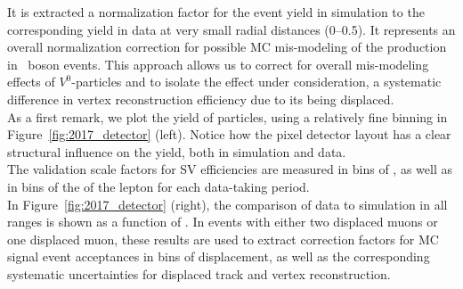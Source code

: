It is extracted a normalization factor for the event yield in
simulation to the corresponding yield in data at very small radial
distances (0--0.5\cm). It represents an overall
normalization correction for possible MC mis-modeling of the
\PKzS production in \PZ~boson events. This approach allows us to correct for
overall mis-modeling effects of $V^0$-particles
and to isolate the effect under consideration, \ie a systematic
difference in vertex reconstruction efficiency due to its being
displaced. \\
As a first remark, we plot the yield of \PKzS particles, using a
relatively fine binning in Figure~\ref{fig:2017_detector} (left). Notice how the pixel detector layout has a clear structural influence on the yield, both in simulation and data.\\
The validation scale factors for SV efficiencies are
measured in bins of \Deltwod, as
well as in bins of the \pt of the lepton
for each data-taking period.\\
In Figure~\ref{fig:2017_detector} (right), the comparison of data to
simulation in all \pt ranges is shown as a function of \Deltwod.
In events with either two displaced muons or one displaced muon, these results are used to
extract correction factors for MC signal
event acceptances in bins of displacement, as well as the corresponding systematic
uncertainties for displaced track and vertex reconstruction.

